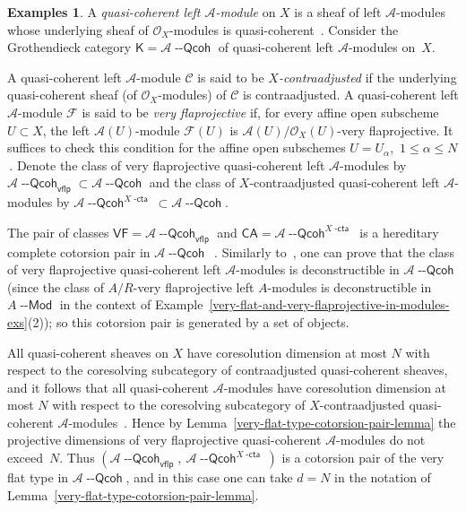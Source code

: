 \documentclass[12pt,a4paper]{amsart}
\newcommand{\+}{\nobreakdash-}
\renewcommand{\:}{\colon}
\newcommand{\Modl}{{\operatorname{\mathsf{--Mod}}}}
\newcommand{\Qcoh}{{\operatorname{\mathsf{--Qcoh}}}}
\newcommand{\sK}{\mathsf K}
\newcommand{\cA}{\mathcal A}
\newcommand{\cF}{\mathcal F}
\newcommand{\cC}{\mathcal C}
\newcommand{\cO}{\mathcal O}
\newcommand{\VF}{\mathsf{VF}}
\newcommand{\CA}{\mathsf{CA}}
\newcommand{\vflp}{\mathsf{vflp}}
\newcommand{\dcta}{{\operatorname{\mathsf{-cta}}}}
\theoremstyle{plain}
\theoremstyle{definition}
\newtheorem{exs}[thm]{Examples}
\begin{document}
\begin{exs}
 A \emph{quasi-coherent left $\cA$\+module} on $X$ is a sheaf of
left $\cA$\+modules whose underlying sheaf of $\cO_X$\+modules is
quasi-coherent~\cite[Section~3.3]{Pdomc}.
 Consider the Grothendieck category $\sK=\cA\Qcoh$ of quasi-coherent
left $\cA$\+modules on~$X$.

 A quasi-coherent left $\cA$\+module $\cC$ is said to be
\emph{$X$\+contraadjusted} if the underlying quasi-coherent sheaf
(of $\cO_X$\+modules) of $\cC$ is contraadjusted.
 A quasi-coherent left $\cA$\+module $\cF$ is said to be
\emph{very flaprojective} if, for every affine open subscheme
$U\subset X$, the left $\cA(U)$\+module $\cF(U)$ is
$\cA(U)/\cO_X(U)$\+very flaprojective.
 It suffices to check this condition for the affine open subschemes
$U=U_\alpha$, \,$1\le\alpha\le N$ \,\cite[Section~4.1]{Pdomc}.
 Denote the class of very flaprojective quasi-coherent left
$\cA$\+modules by $\cA\Qcoh_\vflp\subset\cA\Qcoh$ and the class of
$X$\+contraadjusted quasi-coherent left $\cA$\+modules by
$\cA\Qcoh^{X\dcta}\subset\cA\Qcoh$.

 The pair of classes $\VF=\cA\Qcoh_\vflp$ and $\CA=\cA\Qcoh^{X\dcta}$ is
a hereditary complete cotorsion pair in $\cA\Qcoh$
\,\cite[Theorem~4.5 and Remark~4.7]{Pdomc}.
 Similarly to~\cite[Lemma~B.3.5]{Pcosh}, one can prove that the class
of very flaprojective quasi-coherent left $\cA$\+modules is
deconstructible in $\cA\Qcoh$ (since the class of $A/R$\+very
flaprojective left $A$\+modules is deconstructible in $A\Modl$ in
the context of
Example~\ref{very-flat-and-very-flaprojective-in-modules-exs}(2));
so this cotorsion pair is generated by a set of objects.

 All quasi-coherent sheaves on $X$ have coresolution dimension at most
$N$ with respect to the coresolving subcategory of contraadjusted
quasi-coherent sheaves, and it follows that all quasi-coherent
$\cA$\+modules have coresolution dimension at most $N$ with respect to
the coresolving subcategory of $X$\+contraadjusted quasi-coherent
$\cA$\+modules~\cite[Lemma~5.7]{Pdomc}.
 Hence by Lemma~\ref{very-flat-type-cotorsion-pair-lemma} the projective
dimensions of very flaprojective quasi-coherent $\cA$\+modules do not
exceed~$N$.
 Thus $(\cA\Qcoh_\vflp,\allowbreak\>\cA\Qcoh^{X\dcta})$ is a cotorsion
pair of the very flat type in $\cA\Qcoh$, and in this case one can take
$d=N$ in the notation of
Lemma~\ref{very-flat-type-cotorsion-pair-lemma}.
\end{exs}
\end{document}
